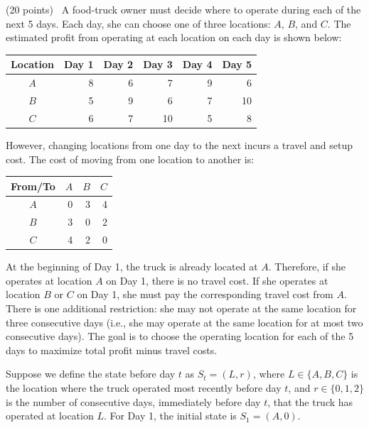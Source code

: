 \documentclass[11pt,letterpaper]{article}
\newenvironment{examquestion}[2]{%
  \clearpage
  \begin{list}{}{%
    \setlength{\leftmargin}{2.15em}%
    \setlength{\labelwidth}{1.55em}%
    \setlength{\labelsep}{0.60em}%
    \setlength{\itemindent}{0pt}%
    \setlength{\listparindent}{0pt}%
    \setlength{\parsep}{0.42em}%
    \setlength{\topsep}{0pt}%
  }
  \item[\hfill #1.] (#2 points)\ 
}{%
  \end{list}
}
\begin{document}
\begin{examquestion}{4}{20}
A food-truck owner must decide where to operate during each of the next 5 days. Each
day, she can choose one of three locations: $A$, $B$, and $C$. The estimated profit
from operating at each location on each day is shown below:

\begin{center}
\begin{tabular}{c|rrrrr}
\toprule
Location&Day 1&Day 2&Day 3&Day 4&Day 5\\
\midrule
$A$&8&6&7&9&6\\
$B$&5&9&6&7&10\\
$C$&6&7&10&5&8\\
\bottomrule
\end{tabular}
\end{center}

However, changing locations from one day to the next incurs a travel and setup cost.
The cost of moving from one location to another is:

\begin{center}
\begin{tabular}{c|rrr}
\toprule
From/To&$A$&$B$&$C$\\
\midrule
$A$&0&3&4\\
$B$&3&0&2\\
$C$&4&2&0\\
\bottomrule
\end{tabular}
\end{center}

At the beginning of Day 1, the truck is already located at $A$. Therefore, if she
operates at location $A$ on Day 1, there is no travel cost. If she operates at
location $B$ or $C$ on Day 1, she must pay the corresponding travel cost from $A$.
There is one additional restriction: she may not operate at the same location for
three consecutive days (i.e., she may operate at the same location for at most two
consecutive days). The goal is to choose the operating location for each of the 5 days
to maximize total profit minus travel costs.

Suppose we define the state before day $t$ as $S_t=(L,r)$, where
$L\in\{A,B,C\}$ is the location where the truck operated most recently before day
$t$, and $r\in\{0,1,2\}$ is the number of consecutive days, immediately before day
$t$, that the truck has operated at location $L$. For Day 1, the initial state is
$S_1=(A,0)$.


\end{examquestion}
\end{document}
